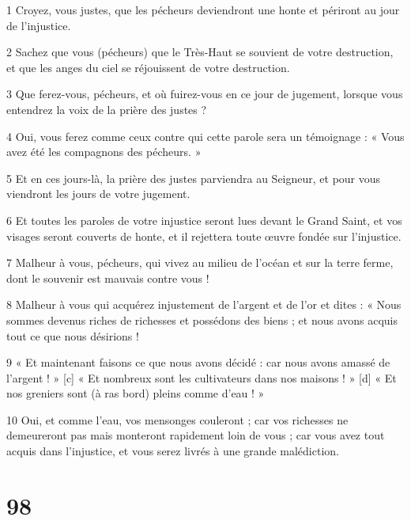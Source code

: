 \par 1 Croyez, vous justes, que les pécheurs deviendront une honte et périront au jour de l'injustice.
\par 2 Sachez que vous (pécheurs) que le Très-Haut se souvient de votre destruction, et que les anges du ciel se réjouissent de votre destruction.
\par 3 Que ferez-vous, pécheurs, et où fuirez-vous en ce jour de jugement, lorsque vous entendrez la voix de la prière des justes ?
\par 4 Oui, vous ferez comme ceux contre qui cette parole sera un témoignage : « Vous avez été les compagnons des pécheurs. »
\par 5 Et en ces jours-là, la prière des justes parviendra au Seigneur, et pour vous viendront les jours de votre jugement.
\par 6 Et toutes les paroles de votre injustice seront lues devant le Grand Saint, et vos visages seront couverts de honte, et il rejettera toute œuvre fondée sur l'injustice.
\par 7 Malheur à vous, pécheurs, qui vivez au milieu de l'océan et sur la terre ferme, dont le souvenir est mauvais contre vous !
\par 8 Malheur à vous qui acquérez injustement de l'argent et de l'or et dites : « Nous sommes devenus riches de richesses et possédons des biens ; et nous avons acquis tout ce que nous désirions !
\par 9 « Et maintenant faisons ce que nous avons décidé : car nous avons amassé de l'argent ! » [c] « Et nombreux sont les cultivateurs dans nos maisons ! » [d] « Et nos greniers sont (à ras bord) pleins comme d'eau ! »
\par 10 Oui, et comme l'eau, vos mensonges couleront ; car vos richesses ne demeureront pas mais monteront rapidement loin de vous ; car vous avez tout acquis dans l'injustice, et vous serez livrés à une grande malédiction.

\chapter{98}

